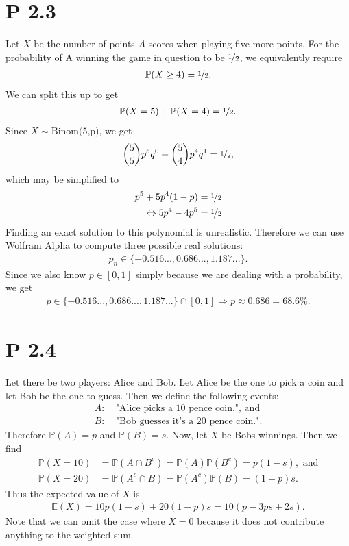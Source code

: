 \documentclass{article}
\renewcommand{\P}{\mathbb{P}}
\newcommand{\E}{\mathbb{E}}
\begin{document}
\section*{P 2.3}
Let $X$ be the number of points $A$ scores when playing five more points.
For the probability of A winning the game in question
to be $\nicefrac{1}{2}$, we equivalently require
\begin{align*}
  \P(X\geq 4) = \nicefrac{1}{2}.
\end{align*}
We can split this up to get
\begin{align*}
  \P(X = 5) + \P(X = 4) = \nicefrac{1}{2}.
\end{align*}
Since $X\sim\text{Binom(5,p)}$, we get
\begin{align*}
  \binom{5}{5}p^5q^0+\binom{5}{4}p^4q^1=\nicefrac{1}{2},
\end{align*}
which may be simplified to
\begin{align*}
  p^5+5p^4(1-p) &= \nicefrac{1}{2}\\
  \Leftrightarrow 5p^4-4p^5&=\nicefrac{1}{2}
\end{align*}
Finding an exact solution to this polynomial is unrealistic.
Therefore we can use Wolfram Alpha to compute three possible real solutions:
\begin{align*}
  p_n \in \{-0.516..., 0.686..., 1.187...\}.
\end{align*}
Since we also know $p\in[0,1]$ simply because we are dealing with a
probability, we get
\begin{align*}
  p\in \{-0.516..., 0.686..., 1.187...\} \cap [0,1] \Rightarrow p \approx 0.686=68.6\%.
\end{align*}
\section*{P 2.4}
Let there be two players: Alice and Bob. Let Alice be the one to pick
a coin and let Bob be the one to guess. Then we define the following
events:
\begin{align*}
  A:&\:\text{"Alice picks a 10 pence coin.", and}\\
  B:&\:\text{"Bob guesses it's a 20 pence coin."}.
\end{align*}
Therefore $\P(A)=p$ and $\P(B)=s$. 
Now, let $X$ be Bobs winnings. Then we find
\begin{align*}
  \P(X=10) &= \P(A\cap B^c) = \P(A)\P(B^c) = p(1-s),\text{ and}\\
  \P(X=20) &= \P(A^c\cap B) = \P(A^c)\P(B) = (1-p)s.
\end{align*}
Thus the expected value of $X$ is
\begin{align*}
  \E(X) = 10p(1-s)+20(1-p)s = 10(p - 3ps + 2s).
\end{align*}
Note that we can omit the case where $X=0$ because it does
not contribute anything to the weighted sum.
\end{document}
